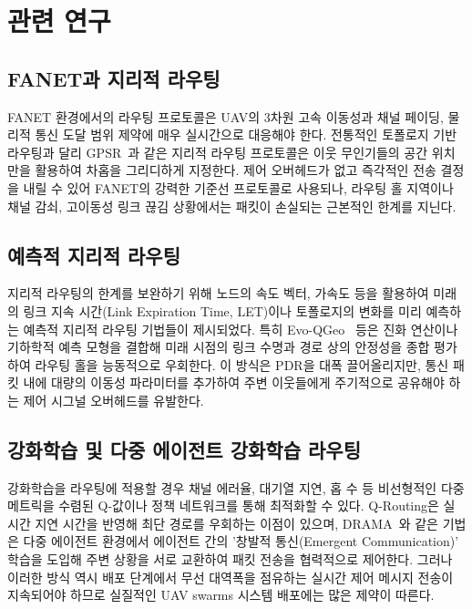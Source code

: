 \section{관련 연구}
\label{sec:관련연구}

\subsection{FANET과 지리적 라우팅}
FANET 환경에서의 라우팅 프로토콜은 UAV의 3차원 고속 이동성과 채널 페이딩, 물리적 통신 도달 범위 제약에 매우 실시간으로 대응해야 한다. 전통적인 토폴로지 기반 라우팅과 달리 GPSR~\cite{gpsr}과 같은 지리적 라우팅 프로토콜은 이웃 무인기들의 공간 위치만을 활용하여 차홉을 그리디하게 지정한다. 제어 오버헤드가 없고 즉각적인 전송 결정을 내릴 수 있어 FANET의 강력한 기준선 프로토콜로 사용되나, 라우팅 홀 지역이나 채널 감쇠, 고이동성 링크 끊김 상황에서는 패킷이 손실되는 근본적인 한계를 지닌다.

\subsection{예측적 지리적 라우팅}
지리적 라우팅의 한계를 보완하기 위해 노드의 속도 벡터, 가속도 등을 활용하여 미래의 링크 지속 시간(Link Expiration Time, LET)이나 토폴로지의 변화를 미리 예측하는 예측적 지리적 라우팅 기법들이 제시되었다. 특히 Evo-QGeo~\cite{evoqgeo} 등은 진화 연산이나 기하학적 예측 모형을 결합해 미래 시점의 링크 수명과 경로 상의 안정성을 종합 평가하여 라우팅 홀을 능동적으로 우회한다. 이 방식은 PDR을 대폭 끌어올리지만, 통신 패킷 내에 대량의 이동성 파라미터를 추가하여 주변 이웃들에게 주기적으로 공유해야 하는 제어 시그널 오버헤드를 유발한다.

\subsection{강화학습 및 다중 에이전트 강화학습 라우팅}
강화학습을 라우팅에 적용할 경우 채널 에러율, 대기열 지연, 홉 수 등 비선형적인 다중 메트릭을 수렴된 Q-값이나 정책 네트워크를 통해 최적화할 수 있다. Q-Routing은 실시간 지연 시간을 반영해 최단 경로를 우회하는 이점이 있으며, DRAMA~\cite{drama}와 같은 기법은 다중 에이전트 환경에서 에이전트 간의 '창발적 통신(Emergent Communication)' 학습을 도입해 주변 상황을 서로 교환하여 패킷 전송을 협력적으로 제어한다. 그러나 이러한 방식 역시 배포 단계에서 무선 대역폭을 점유하는 실시간 제어 메시지 전송이 지속되어야 하므로 실질적인 UAV swarms 시스템 배포에는 많은 제약이 따른다.

